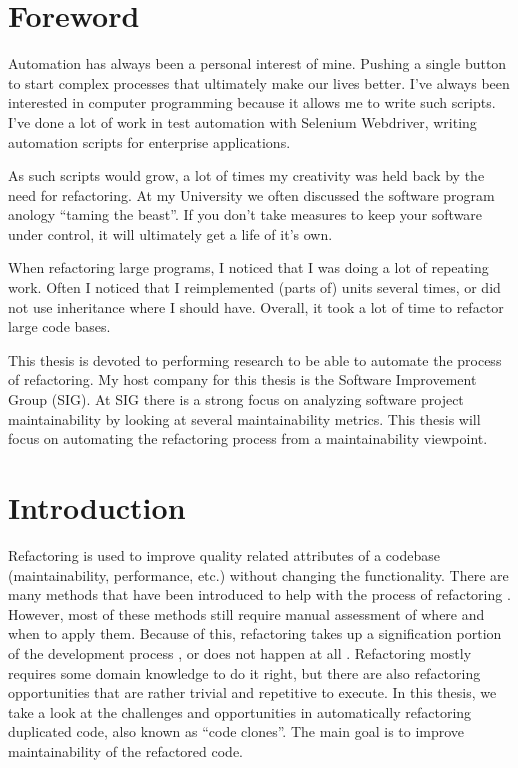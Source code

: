 \documentclass{report}
\theoremstyle{definition}
\theoremstyle{remark}
\begin{document}
\chapter{Foreword}
Automation has always been a personal interest of mine. Pushing a single button to start complex processes that ultimately make our lives better. I've always been interested in computer programming because it allows me to write such scripts. I've done a lot of work in test automation with Selenium Webdriver, writing automation scripts for enterprise applications.

As such scripts would grow, a lot of times my creativity was held back by the need for refactoring. At my University we often discussed the software program anology ``taming the beast''. If you don't take measures to keep your software under control, it will ultimately get a life of it's own.

When refactoring large programs, I noticed that I was doing a lot of repeating work. Often I noticed that I reimplemented (parts of) units several times, or did not use inheritance where I should have. Overall, it took a lot of time to refactor large code bases.

This thesis is devoted to performing research to be able to automate the process of refactoring. My host company for this thesis is the Software Improvement Group (SIG). At SIG there is a strong focus on analyzing software project maintainability by looking at several maintainability metrics. This thesis will focus on automating the refactoring process from a maintainability viewpoint.

\chapter{Introduction}
Refactoring is used to improve quality related attributes of a codebase (maintainability, performance, etc.) without changing the functionality. There are many methods that have been introduced to help with the process of refactoring \cite{fowler2018refactoring, wake2004refactoring}. However, most of these methods still require manual assessment of where and when to apply them. Because of this, refactoring takes up a signification portion of the development process \cite{lientz1978characteristics, mens2004survey}, or does not happen at all \cite{mens2003refactoring}. Refactoring mostly requires some domain knowledge to do it right, but there are also refactoring opportunities that are rather trivial and repetitive to execute. In this thesis, we take a look at the challenges and opportunities in automatically refactoring duplicated code, also known as ``code clones''. The main goal is to improve maintainability of the refactored code.
\end{document}
